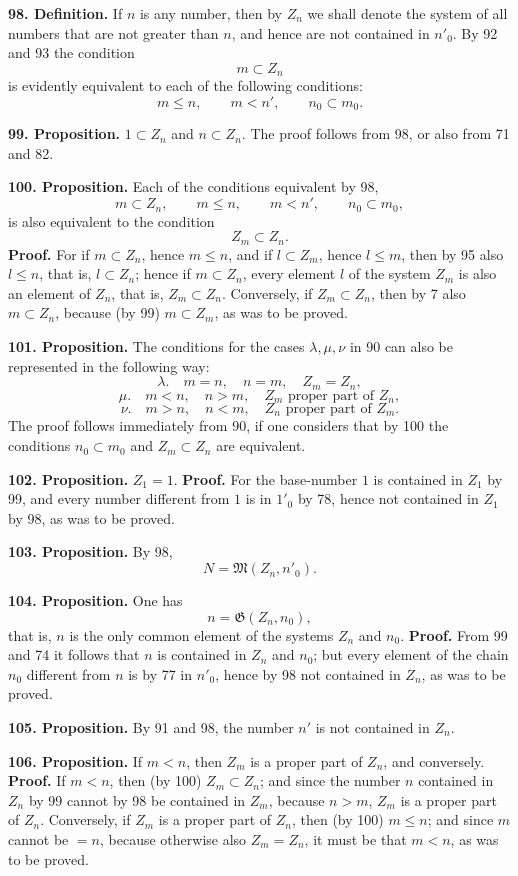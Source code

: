 \documentclass[11pt]{article}
\newcommand{\Mf}{\mathfrak{M}}
\newcommand{\Gf}{\mathfrak{G}}
\newcommand{\partof}{\mathrel{\subset}}
\begin{document}
\noindent\textbf{98. Definition.} If $n$ is any number, then by $Z_n$ we shall denote the system of all numbers that are not greater than $n$, and hence are not contained in $n'_0$. By 92 and 93 the condition
\[
m\partof Z_n
\]
is evidently equivalent to each of the following conditions:
\[
m\le n,\qquad m<n',\qquad n_0\partof m_0.
\]

\noindent\textbf{99. Proposition.} $1\partof Z_n$ and $n\partof Z_n$. The proof follows from 98, or also from 71 and 82.

\noindent\textbf{100. Proposition.} Each of the conditions equivalent by 98,
\[
m\partof Z_n,\qquad m\le n,\qquad m<n',\qquad n_0\partof m_0,
\]
is also equivalent to the condition
\[
Z_m\partof Z_n.
\]
\textbf{Proof.} For if $m\partof Z_n$, hence $m\le n$, and if $l\partof Z_m$, hence $l\le m$, then by 95 also $l\le n$, that is, $l\partof Z_n$; hence if $m\partof Z_n$, every element $l$ of the system $Z_m$ is also an element of $Z_n$, that is, $Z_m\partof Z_n$. Conversely, if $Z_m\partof Z_n$, then by 7 also $m\partof Z_n$, because (by 99) $m\partof Z_m$, as was to be proved.

\noindent\textbf{101. Proposition.} The conditions for the cases $\lambda,\mu,\nu$ in 90 can also be represented in the following way:
\[
\lambda.\quad m=n,\quad n=m,\quad Z_m=Z_n,
\]
\[
\mu.\quad m<n,\quad n>m,\quad Z_m\text{ proper part of }Z_n,
\]
\[
\nu.\quad m>n,\quad n<m,\quad Z_n\text{ proper part of }Z_m.
\]
The proof follows immediately from 90, if one considers that by 100 the conditions $n_0\partof m_0$ and $Z_m\partof Z_n$ are equivalent.

\noindent\textbf{102. Proposition.} $Z_1=1$. \textbf{Proof.} For the base-number $1$ is contained in $Z_1$ by 99, and every number different from $1$ is in $1'_0$ by 78, hence not contained in $Z_1$ by 98, as was to be proved.

\noindent\textbf{103. Proposition.} By 98,
\[
N=\Mf(Z_n,n'_0).
\]

\noindent\textbf{104. Proposition.} One has
\[
n=\Gf(Z_n,n_0),
\]
that is, $n$ is the only common element of the systems $Z_n$ and $n_0$. \textbf{Proof.} From 99 and 74 it follows that $n$ is contained in $Z_n$ and $n_0$; but every element of the chain $n_0$ different from $n$ is by 77 in $n'_0$, hence by 98 not contained in $Z_n$, as was to be proved.

\noindent\textbf{105. Proposition.} By 91 and 98, the number $n'$ is not contained in $Z_n$.

\noindent\textbf{106. Proposition.} If $m<n$, then $Z_m$ is a proper part of $Z_n$, and conversely. \textbf{Proof.} If $m<n$, then (by 100) $Z_m\partof Z_n$; and since the number $n$ contained in $Z_n$ by 99 cannot by 98 be contained in $Z_m$, because $n>m$, $Z_m$ is a proper part of $Z_n$. Conversely, if $Z_m$ is a proper part of $Z_n$, then (by 100) $m\le n$; and since $m$ cannot be $=n$, because otherwise also $Z_m=Z_n$, it must be that $m<n$, as was to be proved.
\end{document}
